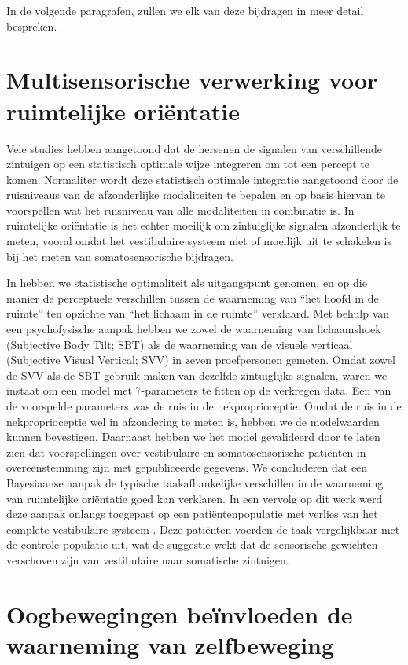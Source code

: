 In de volgende paragrafen, zullen we elk van deze bijdragen in meer detail bespreken.

\section{Multisensorische verwerking voor ruimtelijke ori\"entatie}

Vele studies hebben aangetoond dat de hersenen de signalen van verschillende zintuigen op een statistisch optimale wijze integreren om tot een percept te komen. Normaliter wordt deze statistisch optimale integratie aangetoond door de ruisniveaus van de afzonderlijke modaliteiten te bepalen en op basis hiervan te voorspellen wat het ruisniveau van alle modaliteiten in combinatie is. In ruimtelijke ori\"entatie is het echter moeilijk om zintuiglijke signalen afzonderlijk te meten, vooral omdat het vestibulaire systeem niet of moeilijk uit te schakelen is bij het meten van somatosensorische bijdragen.

In  hebben we statistische optimaliteit als uitgangspunt genomen, en op die manier de perceptuele verschillen tussen de waarneming van ``het hoofd in de ruimte'' ten opzichte van ``het lichaam in de ruimte'' verklaard. Met behulp van een psychofysische aanpak hebben we zowel de waarneming van lichaamshoek (Subjective Body Tilt; SBT) als de waarneming van de visuele verticaal (Subjective Visual Vertical; SVV) in zeven proefpersonen gemeten. Omdat zowel de SVV als de SBT gebruik maken van dezelfde zintuiglijke signalen, waren we instaat om een model met 7-parameters te fitten op de verkregen data. Een van de voorspelde parameters was de ruis in de nekproprioceptie. Omdat de ruis in de nekproprioceptie wel in afzondering te meten is, hebben we de modelwaarden kunnen bevestigen. Daarnaast hebben we het model gevalideerd door te laten zien dat voorspellingen over vestibulaire en somatosensorische pati\"enten in overeenstemming zijn met gepubliceerde gegevens. We concluderen dat een Bayesiaanse aanpak de typische taakafhankelijke verschillen in de waarneming van ruimtelijke ori\"entatie goed kan verklaren. In een vervolg op dit werk werd deze aanpak onlangs toegepast op een pati\"entenpopulatie met verlies van het complete vestibulaire systeem \cite{alberts2015}. Deze pati\"enten voerden de taak vergelijkbaar met de controle populatie uit, wat de suggestie wekt dat de sensorische gewichten verschoven zijn van vestibulaire naar somatische zintuigen.


\section{Oogbewegingen be\"invloeden de waarneming van zelfbeweging}

